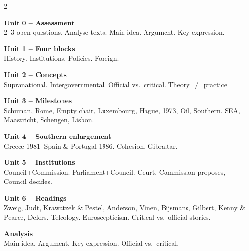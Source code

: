 \documentclass[8pt,landscape,a4paper]{article}
\begin{document}
\newpage
\vspace*{0.3em}
\noindent\color{noteblue}
\setlength{\parskip}{0.3em}
\begin{multicols}{2}

\textbf{Unit 0 -- Assessment}\\
2--3 open questions. Analyse texts. Main idea. Argument. Key expression.

\textbf{Unit 1 -- Four blocks}\\
History. Institutions. Policies. Foreign.

\textbf{Unit 2 -- Concepts}\\
Supranational. Intergovernmental. Official vs.\ critical. Theory $\neq$ practice.

\textbf{Unit 3 -- Milestones}\\
Schuman, Rome, Empty chair, Luxembourg, Hague, 1973, Oil, Southern, SEA, Maastricht, Schengen, Lisbon.

\textbf{Unit 4 -- Southern enlargement}\\
Greece 1981. Spain \& Portugal 1986. Cohesion. Gibraltar.

\textbf{Unit 5 -- Institutions}\\
Council+Commission. Parliament+Council. Court. Commission proposes, Council decides.

\textbf{Unit 6 -- Readings}\\
Zweig, Judt, Krawatzek \& Pestel, Anderson, Vinen, Bijsmans, Gilbert, Kenny \& Pearce, Delors. Teleology. Euroscepticism. Critical vs.\ official stories.

\textbf{Analysis}\\
Main idea. Argument. Key expression. Official vs.\ critical.

\end{multicols}
\vfill
\normalsize\normalfont\color{black}
\end{document}
